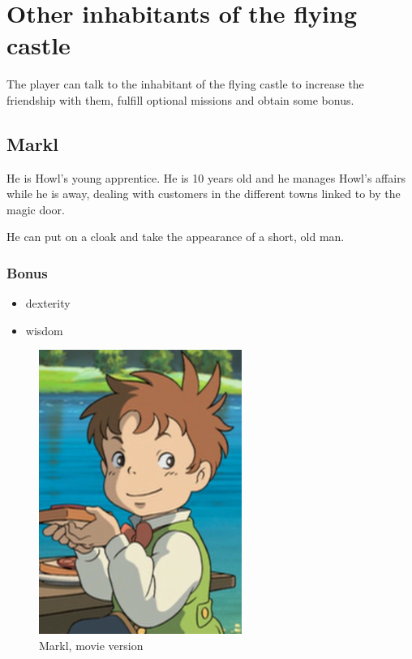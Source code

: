\section{Other inhabitants of the flying castle}

The player can talk to the inhabitant of the flying castle to increase the friendship with them, fulfill optional missions and obtain some bonus.

\subsection{Markl}

\begin{minipage}[t]{0.5\textwidth}
He is Howl’s young apprentice. He is 10 years old and he manages Howl's affairs while he is away, dealing with customers in the different towns linked to by the magic door.

He can put on a cloak and take the appearance of a short, old man.

\subsubsection{Bonus}
\begin{itemize}
	\item dexterity
	\item wisdom
\end{itemize}

\end{minipage}%
%
\hfill
\begin{minipage}[t]{0.4\textwidth}
  \begin{figure}[H]
    \hfill\includegraphics{Images/Characters/markl_portrait}
    \caption{Markl, movie version}
  \end{figure}
\end{minipage}


